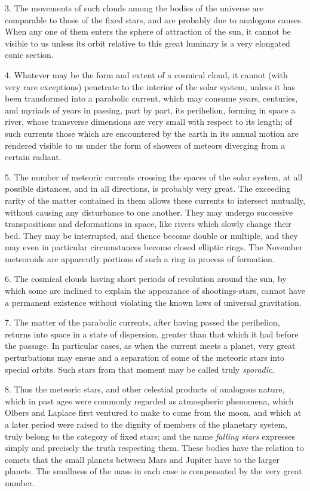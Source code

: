 \documentclass[a4paper, 12pt, oneside, polutonikogreek, english]{article}
\begin{document}
3. The movements of such clouds among the bodies of the universe are comparable to those of the fixed stars, and are probably due to analogous causes. When any one of them enters the sphere of attraction of the sun, it cannot be visible to us unless its orbit relative to this great luminary is a very elongated conic section.

4. Whatever may be the form and extent of a cosmical cloud, it cannot (with very rare exceptions) penetrate to the interior of the solar system, unless it has been transformed into a parabolic current, which may consume years, centuries, and myriads of years in passing, part by part, its perihelion, forming in space a river, whose transverse dimensions are very small with respect to its length; of such currents those which are encountered by the earth in its annual motion are rendered visible to us under the form of showers of meteors diverging from a certain radiant.

5. The number of meteoric currents crossing the spaces of the solar system, at all possible distances, and in all directions, is probably very great. The exceeding rarity of the matter contained in them allows these currents to intersect mutually, without causing any disturbance to one another. They may undergo successive transpositions and deformations in space, like rivers which slowly change their bed. They may be interrupted, and thence become double or multiple, and they may even in particular circumstances become closed elliptic rings. The November meteoroids are apparently portions of such a ring in process of formation.

6. The cosmical clouds having short periods of revolution around the sun, by which some are inclined to explain the appearance of shootings-stars, cannot have a permanent existence without violating the known laws of universal gravitation.

7. The matter of the parabolic currents, after having passed the perihelion, returns into space in a state of dispersion, greater than that which it had before the passage. In particular cases, as when the current meets a planet, very great perturbations may ensue and a separation of some of the meteoric stars into special orbits. Such stars from that moment may be called truly \emph{sporadic}.

8. Thus the meteoric stars, and other celestial products of analogous nature, which in past ages were commonly regarded as atmospheric phenomena, which Olbers and Laplace first ventured to make to come from the moon, and which at a later period were raised to the dignity of members of the planetary system, truly belong to the category of fixed stars; and the name \emph{falling stars} expresses simply and precisely the truth respecting them. These bodies have the relation to comets that the small planets between Mars and Jupiter have to the larger planets. The smallness of the mass in each case is compensated by the very great number.
\end{document}

